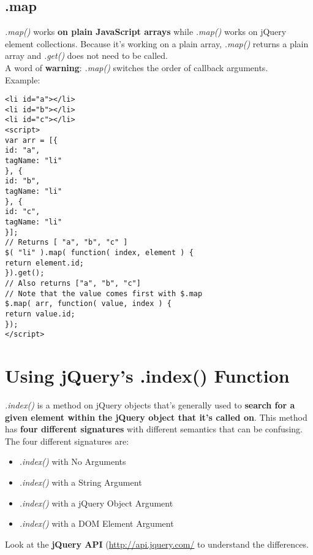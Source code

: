 \documentclass[10pt,letterpaper]{book}
\begin{document}
\subsection{\textdollar.map} 
\textit{\textdollar.map()} works \textbf{on plain JavaScript arrays} while \textit{.map()} works on jQuery element collections. Because it's working on a plain array, \textit{\textdollar.map()} returns a plain array and \textit{.get()} does not need to be called.\\
A word of \textbf{warning}: \textit{\textdollar.map()} switches the order of callback arguments.\\
Example:
\begin{lstlisting}
<li id="a"></li>
<li id="b"></li>
<li id="c"></li>
<script>
var arr = [{
id: "a",
tagName: "li"
}, {
id: "b",
tagName: "li"
}, {
id: "c",
tagName: "li"
}];
// Returns [ "a", "b", "c" ]
$( "li" ).map( function( index, element ) {
return element.id;
}).get();
// Also returns ["a", "b", "c"]
// Note that the value comes first with $.map
$.map( arr, function( value, index ) {
return value.id;
});
</script>
\end{lstlisting}
\section{Using jQuery's .index() Function}
\textit{.index()} is a method on jQuery objects that's generally used to \textbf{search for a given element within the jQuery object that it's called on}. This method has \textbf{four different signatures} with different semantics that can be confusing.\\
The four different signatures are:
\begin{itemize}
\item \textit{.index()} with No Arguments
\item \textit{.index()} with a String Argument
\item \textit{.index()} with a jQuery Object Argument
\item \textit{.index()} with a DOM Element Argument
\end{itemize}
Look at the \textbf{jQuery API} (\url{http://api.jquery.com/} to understand the differences.
\end{document}
